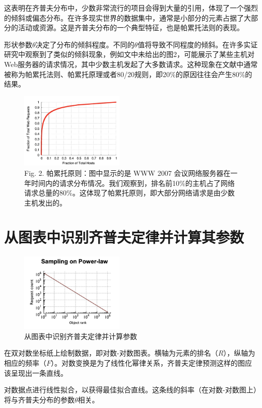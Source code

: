 这表明在齐普夫分布中，少数非常流行的项目会得到大量的引用，体现了一个强烈的倾斜或偏态分布。在许多现实世界的数据集中，通常是小部分的元素占据了大部分的活动或资源。这是齐普夫分布的一个典型特征，也是帕累托法则的表现。

形状参数$\theta$决定了分布的倾斜程度。不同的$\theta$值将导致不同程度的倾斜。在许多实证研究中观察到了类似的倾斜现象，例如文中未给出的图2，可能展示了某些主机对Web服务器的请求情况，其中少数主机发起了大多数请求。这种现象在文献中通常被称为帕累托法则、帕累托原理或者80/20规则，即20\%的原因往往会产生80\%的结果。

\begin{figure}[h]
    \centering
    \includegraphics[width=5cm]{res/zipfex.png}
    \caption{Fig. 2. 帕累托原则：图中显示的是 WWW 2007 会议网络服务器在一年时间内的请求分布情况。我们观察到，排名前10\%的主机占了网络请求总量的80\%。这体现了帕累托原则，即大部分网络请求是由少数主机发出的。}
\end{figure}

\section{从图表中识别齐普夫定律并计算其参数}
\begin{figure}[h]
    \centering
    \includegraphics[width=5cm]{res/facebookpowerlaw.png}
    \caption{从图表中识别齐普夫定律并计算参数}
\end{figure}

在双对数坐标纸上绘制数据，即对数-对数图表。横轴为元素的排名（$R$），纵轴为相应的频率（$F$）。对数变换是为了线性化幂律关系，齐普夫定律预测这样的图应该呈现出一条直线。

对数据点进行线性拟合，以获得最佳拟合直线。这条线的斜率（在对数-对数图上）将与齐普夫分布的参数$\theta$相关。

